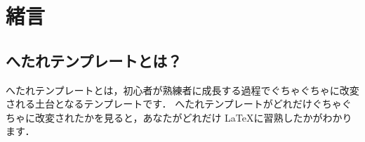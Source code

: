 \chapter{緒言}
\section{へたれテンプレートとは？}
へたれテンプレートとは，初心者が熟練者に成長する過程でぐちゃぐちゃに改変される土台となるテンプレートです．
へたれテンプレートがどれだけぐちゃぐちゃに改変されたかを見ると，あなたがどれだけ \LaTeX に習熟したかがわかります．
